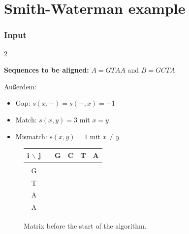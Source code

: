 

\section{Smith-Waterman example}\label{sec:smith-waterman-example}

\subsubsection*{Input}
\begin{multicols}{2}
    \begin{algorithmic}
        \Statex \textbf{Sequences to be aligned:} $A=GTAA$ and $B=GCTA$
    \end{algorithmic}

    Außerdem:
    \begin{itemize}
        \item  Gap: $s(x,-) = s(-,x) = -1$
        \item Match: $ s(x,y) = 3$ mit $x = y$
        \item Mismatch: $s(x,y) = 1$ mit $x \neq y$
    \end{itemize}

    \begin{figure}[H]
        \centering
        \begin{tabular}{c || c | c | c | c | c |}
            i $\backslash$ j & \phantom{G} & G & C & T &  A   \\ \hline \hline
            & & & & &  \\ \hline
            G& & & & & \\ \hline
            T& & & & &  \\ \hline
            A& & & & &  \\ \hline
            A& & & & &  \\ \hline
        \end{tabular}
        \caption{Matrix before the start of the algorithm.}
        \label{fig:beforestart}
    \end{figure}
\end{multicols}


